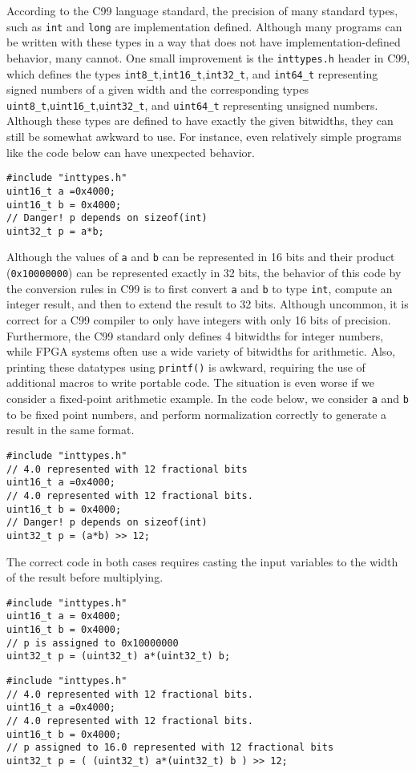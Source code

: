 According to the C99 language standard, the precision of many standard types, such as \lstinline|int| and \lstinline|long| are implementation defined.  Although many programs can be written with these types in a way that does not have implementation-defined behavior, many cannot.  One small improvement is the \lstinline{inttypes.h} header in C99, which defines the types \lstinline|int8_t|,\lstinline|int16_t|,\lstinline|int32_t|, and \lstinline|int64_t| representing signed numbers of a given width and the corresponding types \lstinline|uint8_t|,\lstinline|uint16_t|,\lstinline|uint32_t|, and \lstinline|uint64_t| representing unsigned numbers.  Although these types are defined to have exactly the given bitwidths, they can still be somewhat awkward to use.  For instance, even relatively simple programs like the code below can have unexpected behavior.
\begin{lstlisting}
#include "inttypes.h"
uint16_t a =0x4000;
uint16_t b = 0x4000;
// Danger! p depends on sizeof(int)
uint32_t p = a*b;  
\end{lstlisting}
Although the values of \lstinline{a} and \lstinline{b} can be represented in 16 bits and their product (\lstinline{0x10000000}) can be represented exactly in 32 bits, the behavior of this code by the conversion rules in C99 is to first convert \lstinline|a| and \lstinline|b| to type \lstinline|int|, compute an integer result, and then to extend the result to 32 bits.  Although uncommon, it is correct for a C99 compiler to only have integers with only 16 bits of precision.  Furthermore, the C99 standard only defines 4 bitwidths for integer numbers, while FPGA systems often use a wide variety of bitwidths for arithmetic.  Also, printing these datatypes using \lstinline{printf()} is awkward, requiring the use of additional macros to write portable code.  The situation is even worse if we consider a fixed-point arithmetic example.  In the code below, we consider \lstinline{a} and \lstinline{b} to be fixed point numbers, and perform normalization correctly to generate a result in the same format.
\begin{lstlisting}
#include "inttypes.h"
// 4.0 represented with 12 fractional bits
uint16_t a =0x4000; 
// 4.0 represented with 12 fractional bits.
uint16_t b = 0x4000; 
// Danger! p depends on sizeof(int)
uint32_t p = (a*b) >> 12; 
\end{lstlisting}

The correct code in both cases requires casting the input variables to the width of the result before multiplying.
\begin{lstlisting}
#include "inttypes.h"
uint16_t a = 0x4000;
uint16_t b = 0x4000;
// p is assigned to 0x10000000
uint32_t p = (uint32_t) a*(uint32_t) b; 
\end{lstlisting}
\begin{lstlisting}
#include "inttypes.h"
// 4.0 represented with 12 fractional bits.
uint16_t a =0x4000; 
// 4.0 represented with 12 fractional bits.
uint16_t b = 0x4000; 
// p assigned to 16.0 represented with 12 fractional bits
uint32_t p = ( (uint32_t) a*(uint32_t) b ) >> 12; 
\end{lstlisting}

